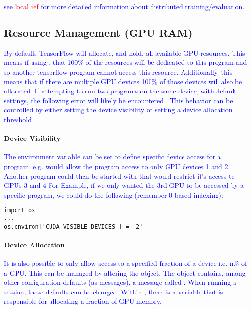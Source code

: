\textcolor{blue}{see \textcolor{red}{local ref} for more detailed information about distributed training/evaluation.}


\subsection{Resource Management (GPU RAM)}

\textcolor{blue}{By default, TensorFlow will allocate, and hold, all available GPU resources. This means if using , that 100\% of the resources will be dedicated to this program and so another tensorflow program cannot access this resource. Additionally, this means that if there are multiple GPU devices 100\% of those devices will also be allocated. If attempting to run two programs on the same device, with default settings, the following error will likely be encountered . This behavior can be controlled by either setting the device visibility or setting a device allocation threshold}

\paragraph{Device Visibility}

\textcolor{blue}{The environment variable  can be set to define specific device access for a program. e.g.  would allow the program access to only GPU devices 1 and 2.  Another program could then be started with  that would restrict it's access to GPUs 3 and 4}
\textcolor{blue}{For Example, if we only wanted the 3rd GPU to be accessed by a specific program, we could do the following (remember 0 based indexing):}

\begin{lstlisting}[style=pyInStyle]
import os
...
os.environ['CUDA_VISIBLE_DEVICES'] = '2'
\end{lstlisting}



\paragraph{Device Allocation}

\textcolor{blue}{It is also possible to only allow access to a specified fraction of a device i.e. n\% of a GPU.  This can be managed by altering the  object. The  object contains, among other configuration defaults (as messages), a message called . When running a session, these defaults can be changed. Within , there is a variable  that is responsible for allocating a fraction of GPU memory.}

